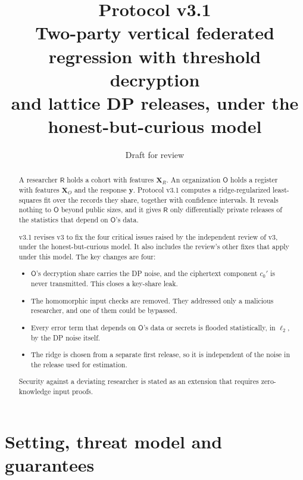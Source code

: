 \documentclass[11pt]{article}
\title{\textbf{Protocol v3.1}\\[4pt]
\large Two-party vertical federated regression with threshold decryption\\ and lattice DP releases, under the honest-but-curious model}
\date{Draft for review}
\theoremstyle{definition}
\theoremstyle{plain}
\newcommand{\Rp}{\mathsf{R}}
\newcommand{\Op}{\mathsf{O}}
\newcommand{\bX}{\mathbf{X}}
\newcommand{\by}{\mathbf{y}}
\begin{document}
\maketitle

\begin{abstract}
\noindent
A researcher $\Rp$ holds a cohort with features $\bX_R$. An organization $\Op$ holds a register with features $\bX_O$ and the response $\by$. Protocol v3.1 computes a ridge-regularized least-squares fit over the records they share, together with confidence intervals. It reveals nothing to $\Op$ beyond public sizes, and it gives $\Rp$ only differentially private releases of the statistics that depend on $\Op$'s data.

v3.1 revises v3 to fix the four critical issues raised by the independent review of v3, under the honest-but-curious model. It also includes the review's other fixes that apply under this model. The key changes are four:
\begin{itemize}[nosep]
  \item $\Op$'s decryption share carries the DP noise, and the ciphertext component $c_0'$ is never transmitted. This closes a key-share leak.
  \item The homomorphic input checks are removed. They addressed only a malicious researcher, and one of them could be bypassed.
  \item Every error term that depends on $\Op$'s data or secrets is flooded statistically, in $\ell_2$, by the DP noise itself.
  \item The ridge is chosen from a separate first release, so it is independent of the noise in the release used for estimation.
\end{itemize}
Security against a deviating researcher is stated as an extension that requires zero-knowledge input proofs.
\end{abstract}

\section{Setting, threat model and guarantees}
\label{sec:model}
\end{document}
